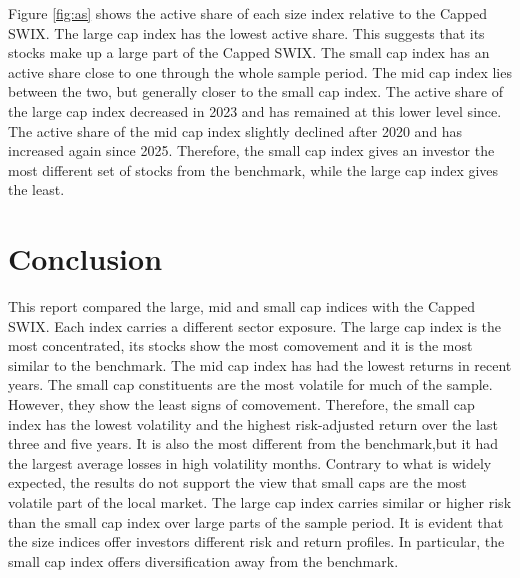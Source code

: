 \documentclass[11pt,preprint]{elsarticle}
\numberwithin{equation}{section}
\numberwithin{figure}{section}
\numberwithin{table}{section}
\begin{document}
Figure \ref{fig:as} shows the active share of each size index relative
to the Capped SWIX. The large cap index has the lowest active share.
This suggests that its stocks make up a large part of the Capped SWIX.
The small cap index has an active share close to one through the whole
sample period. The mid cap index lies between the two, but generally
closer to the small cap index. The active share of the large cap index
decreased in 2023 and has remained at this lower level since. The active
share of the mid cap index slightly declined after 2020 and has
increased again since 2025. Therefore, the small cap index gives an
investor the most different set of stocks from the benchmark, while the
large cap index gives the least.

\section{\texorpdfstring{Conclusion
\label{Conc}}{Conclusion }}\label{conclusion}

This report compared the large, mid and small cap indices with the
Capped SWIX. Each index carries a different sector exposure. The large
cap index is the most concentrated, its stocks show the most comovement
and it is the most similar to the benchmark. The mid cap index has had
the lowest returns in recent years. The small cap constituents are the
most volatile for much of the sample. However, they show the least signs
of comovement. Therefore, the small cap index has the lowest volatility
and the highest risk-adjusted return over the last three and five years.
It is also the most different from the benchmark,but it had the largest
average losses in high volatility months. Contrary to what is widely
expected, the results do not support the view that small caps are the
most volatile part of the local market. The large cap index carries
similar or higher risk than the small cap index over large parts of the
sample period. It is evident that the size indices offer investors
different risk and return profiles. In particular, the small cap index
offers diversification away from the benchmark.


\end{document}
